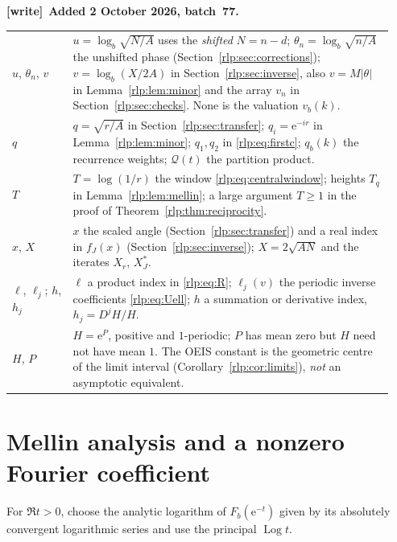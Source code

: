 \documentclass[11pt,letterpaper]{article}
\numberwithin{equation}{section}
\theoremstyle{remark}\newtheorem{remark}[theorem]{Remark}
\newcommand{\ee}{\mathrm e}
\newcommand{\Log}{\operatorname{Log}}
\newenvironment{writenote}[1][]{\par\smallskip\begingroup\small
 \noindent\textbf{[write]}\if\relax\detokenize{#1}\relax\else~\textbf{#1.}\fi\ }%
 {\par\endgroup\smallskip}
\begin{document}
\begin{writenote}[Added 2 October 2026, batch~77]
\begin{table}[tbp]
\begin{tabular}{@{}p{0.15\linewidth}p{0.79\linewidth}@{}}
$u$, $\theta_n$, $v$ & $u=\log_b\sqrt{N/A}$ uses the \emph{shifted} $N=n-d$; $\theta_n=\log_b\sqrt{n/A}$ the unshifted phase (Section~\ref{rlp:sec:corrections}); $v=\log_b(X/2A)$ in Section~\ref{rlp:sec:inverse}, also $v=M|\theta|$ in Lemma~\ref{rlp:lem:minor} and the array $v_n$ in Section~\ref{rlp:sec:checks}. None is the valuation $v_b(k)$.\\
$q$ & $q=\sqrt{r/A}$ in Section~\ref{rlp:sec:transfer}; $q_i=\ee^{-ir}$ in Lemma~\ref{rlp:lem:minor}; $q_1,q_2$ in \eqref{rlp:eq:firstc}; $q_b(k)$ the recurrence weights; $\mathcal Q(t)$ the partition product.\\
$T$ & $T=\log(1/r)$ the window \eqref{rlp:eq:centralwindow}; heights $T_q$ in Lemma~\ref{rlp:lem:mellin}; a large argument $T\ge1$ in the proof of Theorem~\ref{rlp:thm:reciprocity}.\\
$x$, $X$ & $x$ the scaled angle (Section~\ref{rlp:sec:transfer}) and a real index in $f_J(x)$ (Section~\ref{rlp:sec:inverse}); $X=2\sqrt{AN}$ and the iterates $X_r$, $X_J^*$.\\
$\ell$, $\ell_j$; $h$, $h_j$ & $\ell$ a product index in \eqref{rlp:eq:R}; $\ell_j(v)$ the periodic inverse coefficients \eqref{rlp:eq:Uell}; $h$ a summation or derivative index, $h_j=D^jH/H$.\\
$H$, $P$ & $H=\ee^P$, positive and $1$-periodic; $P$ has mean zero but $H$ need not have mean $1$. The OEIS constant is the geometric centre of the limit interval (Corollary~\ref{rlp:cor:limits}), \emph{not} an asymptotic equivalent.\\
\bottomrule
\end{tabular}
\end{table}
\end{writenote}

\section{Mellin analysis and a nonzero Fourier coefficient}
\label{rlp:sec:mellin}
For $\Re t>0$, choose the analytic logarithm of $F_b(\ee^{-t})$ given by its absolutely convergent logarithmic series and use the principal $\Log t$.
\end{document}

